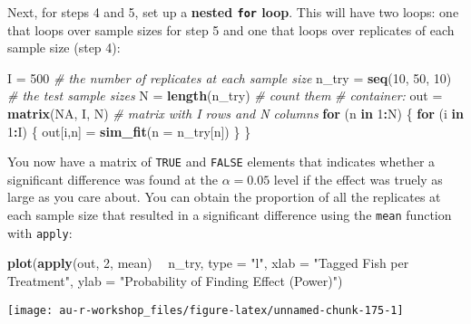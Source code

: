 \documentclass[]{book}
\newenvironment{Shaded}{\begin{snugshade}}{\end{snugshade}}
\newcommand{\KeywordTok}[1]{\textcolor[rgb]{0.13,0.29,0.53}{\textbf{#1}}}
\newcommand{\DataTypeTok}[1]{\textcolor[rgb]{0.13,0.29,0.53}{#1}}
\newcommand{\DecValTok}[1]{\textcolor[rgb]{0.00,0.00,0.81}{#1}}
\newcommand{\StringTok}[1]{\textcolor[rgb]{0.31,0.60,0.02}{#1}}
\newcommand{\CommentTok}[1]{\textcolor[rgb]{0.56,0.35,0.01}{\textit{#1}}}
\newcommand{\OtherTok}[1]{\textcolor[rgb]{0.56,0.35,0.01}{#1}}
\newcommand{\ControlFlowTok}[1]{\textcolor[rgb]{0.13,0.29,0.53}{\textbf{#1}}}
\newcommand{\OperatorTok}[1]{\textcolor[rgb]{0.81,0.36,0.00}{\textbf{#1}}}
\newcommand{\NormalTok}[1]{#1}
\theoremstyle{definition}
\theoremstyle{definition}
\theoremstyle{definition}
\theoremstyle{remark}
\begin{document}
Next, for steps 4 and 5, set up a \textbf{nested \texttt{for} loop}.
This will have two loops: one that loops over sample sizes for step 5
and one that loops over replicates of each sample size (step 4):

\begin{Shaded}
\begin{Highlighting}[]
\NormalTok{I =}\StringTok{ }\DecValTok{500}  \CommentTok{# the number of replicates at each sample size}
\NormalTok{n_try =}\StringTok{ }\KeywordTok{seq}\NormalTok{(}\DecValTok{10}\NormalTok{, }\DecValTok{50}\NormalTok{, }\DecValTok{10}\NormalTok{)  }\CommentTok{# the test sample sizes}
\NormalTok{N =}\StringTok{ }\KeywordTok{length}\NormalTok{(n_try)        }\CommentTok{# count them}
\CommentTok{# container: }
\NormalTok{out =}\StringTok{ }\KeywordTok{matrix}\NormalTok{(}\OtherTok{NA}\NormalTok{, I, N) }\CommentTok{# matrix with I rows and N columns}
\ControlFlowTok{for}\NormalTok{ (n }\ControlFlowTok{in} \DecValTok{1}\OperatorTok{:}\NormalTok{N) \{}
  \ControlFlowTok{for}\NormalTok{ (i }\ControlFlowTok{in} \DecValTok{1}\OperatorTok{:}\NormalTok{I) \{}
\NormalTok{    out[i,n] =}\StringTok{ }\KeywordTok{sim_fit}\NormalTok{(}\DataTypeTok{n =}\NormalTok{ n_try[n])}
\NormalTok{  \}}
\NormalTok{\}}
\end{Highlighting}
\end{Shaded}

You now have a matrix of \texttt{TRUE} and \texttt{FALSE} elements that
indicates whether a significant difference was found at the
\(\alpha = 0.05\) level if the effect was truely as large as you care
about. You can obtain the proportion of all the replicates at each
sample size that resulted in a significant difference using the
\texttt{mean} function with \texttt{apply}:

\begin{Shaded}
\begin{Highlighting}[]
\KeywordTok{plot}\NormalTok{(}\KeywordTok{apply}\NormalTok{(out, }\DecValTok{2}\NormalTok{, mean) }\OperatorTok{~}\StringTok{ }\NormalTok{n_try, }\DataTypeTok{type =} \StringTok{"l"}\NormalTok{,}
     \DataTypeTok{xlab =} \StringTok{"Tagged Fish per Treatment"}\NormalTok{,}
     \DataTypeTok{ylab =} \StringTok{"Probability of Finding Effect (Power)"}\NormalTok{)}
\end{Highlighting}
\end{Shaded}

\begin{center}\texttt{[image: au-r-workshop\_files/figure-latex/unnamed-chunk-175-1]} \end{center}
\end{document}
